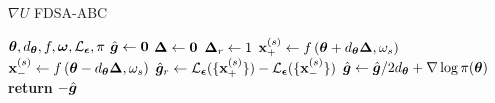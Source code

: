 \begin{algorithm}[t]
	\caption{$\nabla U$ FDSA-ABC}\label{algo:fdsa}
	\begin{algorithmic}
		 ${\bm \theta}, d_{{\bm \theta}}, f, {\bm \omega}, \mathcal{L}_{{\bm {\epsilon}}}, \pi$ 
		\STATE $\hat{{\bm g }} \leftarrow {\bm 0}$
        \STATE ${\bm \Delta} \leftarrow {\bm 0}$ 
        \STATE ${\bm \Delta}_r \leftarrow 1$
          \STATE ${\bf x}^{(s)}_{+} \leftarrow f\left( {\bm \theta} + d_{{\bm \theta}} {\bm \Delta}, \omega_s \right)$
          \STATE ${\bf x}^{(s)}_{-} \leftarrow f\left( {\bm \theta} - d_{{\bm \theta}} {\bm \Delta}, \omega_s \right)$
        \ENDFOR
        \STATE $\hat{{\bm g }}_r \leftarrow \mathcal{L}_{{\bm {\epsilon}}}( \{{\bf x}^{(s)}_{+}\}) - \mathcal{L}_{{\bm {\epsilon}}}( \{{\bf x}^{(s)}_{-}\})$
			\ENDFOR
    \STATE $\hat{{\bm g }} \leftarrow \hat{{\bm g }}/ 2d_{{\bm \theta}} + \nabla \log \pi({\bm \theta})$
		\STATE \textbf{return} $-\hat{{\bm g }}$
	\end{algorithmic}
\end{algorithm}